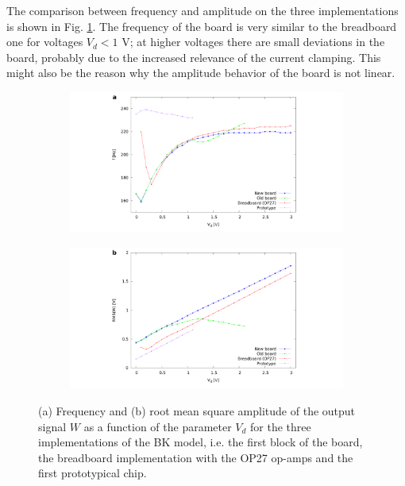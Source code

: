 The comparison between frequency and amplitude on the three
implementations is shown in Fig. \ref{fig:comparison}.
The frequency of the board is very similar to the breadboard one
for voltages $V_d < 1$ V; at higher voltages there are small
deviations in the board, probably due to the increased relevance
of the current clamping. This might also be the reason why the
amplitude behavior of the board is not linear.

\begin{figure}[H]
    \centering
    \begin{subfigure}{.49\textwidth}
        \includegraphics[width=\linewidth,trim={10cm 0 9cm 0},clip,left]
        {../1_block/images/freq_comparison.pdf}
    \end{subfigure}
    \begin{subfigure}{.49\textwidth}
        \centering
        \includegraphics[width=\linewidth,trim={9cm 0 10cm 0},clip,right]
        {../1_block/images/rms_comparison.pdf}
    \end{subfigure}
    \caption{(a) Frequency and (b) root mean square amplitude
    of the output signal $W$ as a function of the parameter $V_d$
    for the three implementations of the BK model, i.e. the first
    block of the board, the breadboard implementation with the
    OP27 op-amps and the first prototypical chip.}
    \label{fig:comparison}
\end{figure}
